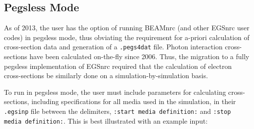 \documentclass[12pt,twoside]{article}
\begin{document}
\subsection{Pegsless Mode}
\label{pegsless_sect}
As of 2013, the user has the option of running BEAMnrc (and other EGSnrc user codes) in pegsless
mode, thus obviating the requirement for a-priori calculation of cross-section data and generation
of a {\tt .pegs4dat} file.  Photon interaction cross-sections have been calculated on-the-fly since
2006.  Thus, the migration to a fully pegsless implementation of EGSnrc required that
the calculation of electron cross-sections be similarly done on a simulation-by-simulation
basis.

To run in pegsless mode, the user must include parameters for calculating cross-sections, including
specifications for all media used in the simulation, in their {\tt .egsinp} file between the
delimiters, {\tt :start media definition:} and {\tt :stop media definition:}.  This is best illustrated
with an example input:
\end{document}
